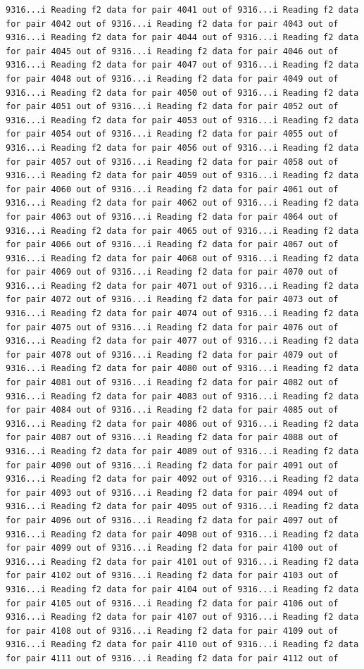 \documentclass[
]{article}
\begin{document}
\begin{verbatim}
9316...i Reading f2 data for pair 4041 out of 9316...i Reading f2 data for pair 4042 out of 9316...i Reading f2 data for pair 4043 out of 9316...i Reading f2 data for pair 4044 out of 9316...i Reading f2 data for pair 4045 out of 9316...i Reading f2 data for pair 4046 out of 9316...i Reading f2 data for pair 4047 out of 9316...i Reading f2 data for pair 4048 out of 9316...i Reading f2 data for pair 4049 out of 9316...i Reading f2 data for pair 4050 out of 9316...i Reading f2 data for pair 4051 out of 9316...i Reading f2 data for pair 4052 out of 9316...i Reading f2 data for pair 4053 out of 9316...i Reading f2 data for pair 4054 out of 9316...i Reading f2 data for pair 4055 out of 9316...i Reading f2 data for pair 4056 out of 9316...i Reading f2 data for pair 4057 out of 9316...i Reading f2 data for pair 4058 out of 9316...i Reading f2 data for pair 4059 out of 9316...i Reading f2 data for pair 4060 out of 9316...i Reading f2 data for pair 4061 out of 9316...i Reading f2 data for pair 4062 out of 9316...i Reading f2 data for pair 4063 out of 9316...i Reading f2 data for pair 4064 out of 9316...i Reading f2 data for pair 4065 out of 9316...i Reading f2 data for pair 4066 out of 9316...i Reading f2 data for pair 4067 out of 9316...i Reading f2 data for pair 4068 out of 9316...i Reading f2 data for pair 4069 out of 9316...i Reading f2 data for pair 4070 out of 9316...i Reading f2 data for pair 4071 out of 9316...i Reading f2 data for pair 4072 out of 9316...i Reading f2 data for pair 4073 out of 9316...i Reading f2 data for pair 4074 out of 9316...i Reading f2 data for pair 4075 out of 9316...i Reading f2 data for pair 4076 out of 9316...i Reading f2 data for pair 4077 out of 9316...i Reading f2 data for pair 4078 out of 9316...i Reading f2 data for pair 4079 out of 9316...i Reading f2 data for pair 4080 out of 9316...i Reading f2 data for pair 4081 out of 9316...i Reading f2 data for pair 4082 out of 9316...i Reading f2 data for pair 4083 out of 9316...i Reading f2 data for pair 4084 out of 9316...i Reading f2 data for pair 4085 out of 9316...i Reading f2 data for pair 4086 out of 9316...i Reading f2 data for pair 4087 out of 9316...i Reading f2 data for pair 4088 out of 9316...i Reading f2 data for pair 4089 out of 9316...i Reading f2 data for pair 4090 out of 9316...i Reading f2 data for pair 4091 out of 9316...i Reading f2 data for pair 4092 out of 9316...i Reading f2 data for pair 4093 out of 9316...i Reading f2 data for pair 4094 out of 9316...i Reading f2 data for pair 4095 out of 9316...i Reading f2 data for pair 4096 out of 9316...i Reading f2 data for pair 4097 out of 9316...i Reading f2 data for pair 4098 out of 9316...i Reading f2 data for pair 4099 out of 9316...i Reading f2 data for pair 4100 out of 9316...i Reading f2 data for pair 4101 out of 9316...i Reading f2 data for pair 4102 out of 9316...i Reading f2 data for pair 4103 out of 9316...i Reading f2 data for pair 4104 out of 9316...i Reading f2 data for pair 4105 out of 9316...i Reading f2 data for pair 4106 out of 9316...i Reading f2 data for pair 4107 out of 9316...i Reading f2 data for pair 4108 out of 9316...i Reading f2 data for pair 4109 out of 9316...i Reading f2 data for pair 4110 out of 9316...i Reading f2 data for pair 4111 out of 9316...i Reading f2 data for pair 4112 out of 
\end{verbatim}
\end{document}
